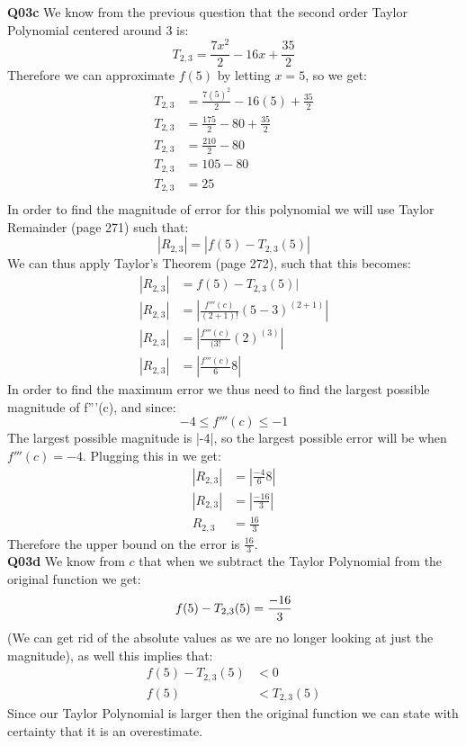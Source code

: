 \documentclass[11pt]{article}
\begin{document}
\textbf{Q03c} We know from the previous question that the second order Taylor Polynomial centered around 3 is:
\[ T_{2,3} = \frac{7x^2}{2} - 16x +\frac{35}{2} \]
Therefore we can approximate $f(5)$ by letting $x = 5$, so we get:
\begin{align*}
T_{2,3}& = \frac{7(5)^2}{2} - 16(5) +\frac{35}{2} \\ 
T_{2,3}& = \frac{175}{2} - 80 +\frac{35}{2} \\
T_{2,3}& = \frac{210}{2} - 80\\
T_{2,3}& = 105 - 80  \\
T_{2,3}& = 25  \\
\end{align*}
In order to find the magnitude of error for this polynomial we will use Taylor Remainder (page 271) such that:
\[ |R_{2,3}| = |f(5) - T_{2,3}(5)| \]
We can thus apply Taylor's Theorem (page 272), such that this becomes:
\begin{align*}
|R_{2,3}| & = f(5) - T_{2,3}(5)|  \\ 
|R_{2,3}| & = |\frac{f'''(c)}{(2+1)!}(5-3)^(2+1)|  \\
|R_{2,3}| & = |\frac{f'''(c)}{(3!}(2)^(3)|   \\
|R_{2,3}| & = |\frac{f'''(c)}{6}8|  
\end{align*}
In order to find the maximum error we thus need to find the largest possible magnitude of f'''(c), and since:
\[ -4 \leq f'''(c) \leq -1 \]
The largest possible magnitude is |-4|, so the largest possible error will be when $f'''(c) = -4$. Plugging this in we get:
\begin{align*}
|R_{2,3}| & = |\frac{-4}{6}8|  \\
|R_{2,3}| & = |\frac{-16}{3}|  \\
R_{2,3} & = \frac{16}{3}
\end{align*}
Therefore the upper bound on the error is $\frac{16}{3}$.\\

\textbf{Q03d} We know from $c$ that when we subtract the Taylor Polynomial from the original function we get:
\[  f(5) - T_{2,3}(5) = \frac{-16}{3}  \\  \]
(We can get rid of the absolute values as we are no longer looking at just the magnitude), as well this implies that:
\begin{align*}
 f(5) - T_{2,3}(5) & < 0 \\
 f(5) & < T_{2,3}(5) 
\end{align*}
Since our Taylor Polynomial is larger then the original function we can state with certainty that it is an overestimate. 
\end{document}
